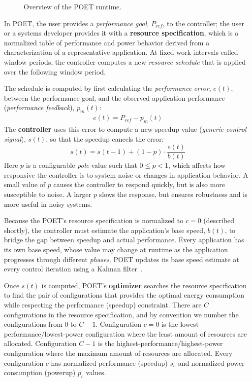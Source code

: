 \begin{figure}[t]
  \begin{centering}
    
    \caption{Overview of the POET runtime.}
    \label{fig:poet-runtime}
  \end{centering}
\end{figure}

In POET, the user provides a \emph{performance goal}, $P_{ref}$, to the controller; the user or a systems developer provides it with a \textbf{resource specification}, which is a normalized table of performance and power behavior derived from a characterization of a representative application.
At fixed work intervals called window periods, the controller computes a new \emph{resource schedule} that is applied over the following window period.

The schedule is computed by first calculating the \emph{performance error}, $e(t)$, between the performance goal, and the observed application performance (\emph{performance feedback}), $p_m(t)$:
\begin{eqnarray}
  e(t) = P_{ref} - p_m(t)
  \label{eqn:error}
\end{eqnarray}
The \textbf{controller} uses this error to compute a new speedup value (\emph{generic control signal}), $s(t)$, so that the speedup cancels the error:
\begin{equation}
  s(t) = s(t-1) + (1-p) \cdot \frac{e(t)}{b(t)} 
  \label{eqn:poet-control}
\end{equation}
Here $p$ is a configurable \emph{pole} value such that $0 \le p < 1$, which affects how responsive the controller is to system noise or changes in application behavior.
A small value of $p$ causes the controller to respond quickly, but is also more susceptible to noise.
A larger $p$ slows the response, but ensures robustness and is more useful in noisy systems.

Because the POET's resource specification is normalized to $c=0$ (described shortly), the controller must estimate the application's base speed, $b(t)$, to bridge the gap between speedup and actual performance.
Every application has its own base speed, whose value may change at runtime as the application progresses through different \emph{phases}.
POET updates its base speed estimate at every control iteration using a Kalman filter~\cite{welch2006kalman}.

Once $s(t)$ is computed, POET's \textbf{optimizer} searches the resource specification to find the pair of configurations that provides the optimal energy consumption while respecting the performance (speedup) constraint.
There are $C$ configurations in the resource specification, and by convention we number the configurations from $0$ to $C-1$.
Configuration $c = 0$ is the lowest-performance/lowest-power configuration where the least amount of resources are allocated.
Configuration $C-1$ is the highest-performance/highest-power configuration where the maximum amount of resources are allocated.
Every configuration $c$ has normalized performance (speedup) $s_c$ and normalized power consumption (powerup) $p_c$ values.

